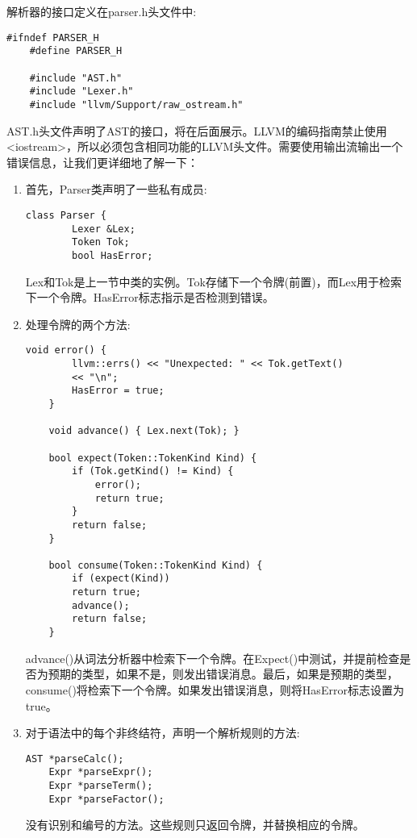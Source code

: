 解析器的接口定义在parser.h头文件中:\par

\begin{lstlisting}[caption={}]
	#ifndef PARSER_H
	#define PARSER_H
	
	#include "AST.h"
	#include "Lexer.h"
	#include "llvm/Support/raw_ostream.h"
\end{lstlisting}

AST.h头文件声明了AST的接口，将在后面展示。LLVM的编码指南禁止使用<iostream>，所以必须包含相同功能的LLVM头文件。需要使用输出流输出一个错误信息，让我们更详细地了解一下：\par

\begin{enumerate}
\item 首先，Parser类声明了一些私有成员:
\begin{lstlisting}[caption={}]
	class Parser {
		Lexer &Lex;
		Token Tok;
		bool HasError;
\end{lstlisting}
Lex和Tok是上一节中类的实例。Tok存储下一个令牌(前置)，而Lex用于检索下一个令牌。HasError标志指示是否检测到错误。

\item 处理令牌的两个方法:
\begin{lstlisting}[caption={}]
	void error() {
		llvm::errs() << "Unexpected: " << Tok.getText()
		<< "\n";
		HasError = true;
	}
	
	void advance() { Lex.next(Tok); }
	
	bool expect(Token::TokenKind Kind) {
		if (Tok.getKind() != Kind) {
			error();
			return true;
		}
		return false;
	}
	
	bool consume(Token::TokenKind Kind) {
		if (expect(Kind))
		return true;
		advance();
		return false;
	}
\end{lstlisting}
advance()从词法分析器中检索下一个令牌。在Expect()中测试，并提前检查是否为预期的类型，如果不是，则发出错误消息。最后，如果是预期的类型，consume()将检索下一个令牌。如果发出错误消息，则将HasError标志设置为true。\par

\item 对于语法中的每个非终结符，声明一个解析规则的方法:
\begin{lstlisting}[caption={}]
	AST *parseCalc();
	Expr *parseExpr();
	Expr *parseTerm();
	Expr *parseFactor();
\end{lstlisting}
\begin{tcolorbox}[colback=blue!5!white,colframe=blue!75!black, title=Note]
	没有识别和编号的方法。这些规则只返回令牌，并替换相应的令牌。
\end{tcolorbox}


\end{enumerate}
